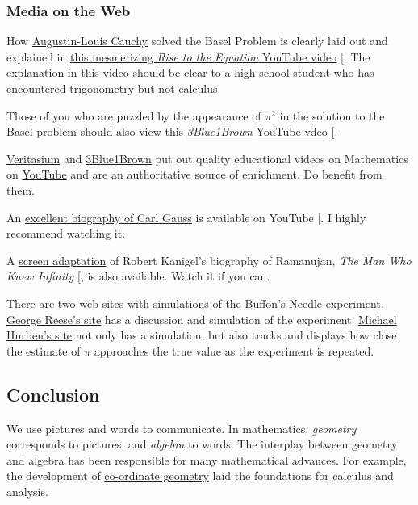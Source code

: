 \documentclass[
  a4paper,
]{article}
\begin{document}
\subsubsection{Media on the Web}\label{media-on-the-web}

How
\href{https://en.wikipedia.org/wiki/Augustin-Louis_Cauchy}{Augustin-Louis
Cauchy} solved the Basel Problem is clearly laid out and explained in
\href{https://www.youtube.com/watch?v=2jgtAo3Ztf}{this mesmerizing
\emph{Rise to the Equation} YouTube video}
{[}\citeproc{ref-cauchy-basel}{52}{]}. The explanation in this video
should be clear to a high school student who has encountered
trigonometry but not calculus.

Those of you who are puzzled by the appearance of \(\pi^2\) in the
solution to the Basel problem should also view this
\href{https://www.youtube.com/watch?v=d-o3eB9sfls}{\emph{3Blue1Brown}
YouTube vdeo} {[}\citeproc{ref-pi-squared-basel}{53}{]}.

\href{https://www.youtube.com/@veritasium}{Veritasium} and
\href{https://www.youtube.com/c/3blue1brown}{3Blue1Brown} put out
quality educational videos on Mathematics on
\href{https://www.youtube.com/}{YouTube} and are an authoritative source
of enrichment. Do benefit from them.

An \href{https://www.youtube.com/watch?v=LmmyAOkajVM}{excellent
biography of Carl Gauss} is available on YouTube
{[}\citeproc{ref-gauss-bio}{31}{]}. I highly recommend watching it.

A \href{https://www.imdb.com/title/tt0787524/}{screen adaptation} of
Robert Kanigel's biography of Ramanujan, \emph{The Man Who Knew
Infinity} {[}\citeproc{ref-kanigel-1992}{41}{]}, is also available.
Watch it if you can.

There are two web sites with simulations of the Buffon's Needle
experiment.
\href{https://www.mste.uiuc.edu/reese/buffon/buffon.html}{George Reese's
site} has a discussion and simulation of the experiment.
\href{https://www.angelfire.com/wa/hurben/buff.html}{Michael Hurben's
site} not only has a simulation, but also tracks and displays how close
the estimate of \(\pi\) approaches the true value as the experiment is
repeated.

\subsection{Conclusion}\label{conclusion}

We use pictures and words to communicate. In mathematics,
\emph{geometry} corresponds to pictures, and \emph{algebra} to words.
The interplay between geometry and algebra has been responsible for many
mathematical advances. For example, the development of
\href{https://www.britannica.com/science/Cartesian-coordinates}{co-ordinate
geometry} laid the foundations for calculus and analysis.
\end{document}

